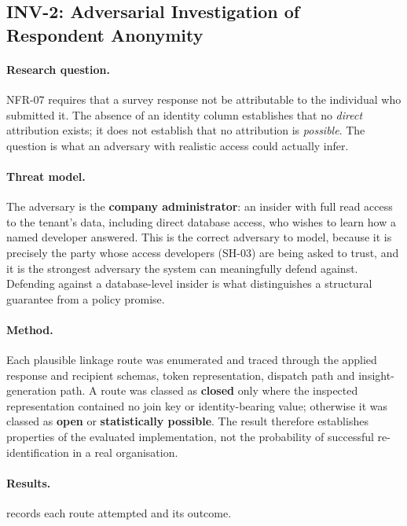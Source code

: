 \subsection{INV-2: Adversarial Investigation of Respondent Anonymity}
\label{subsec:inv2}

\paragraph{Research question.} NFR-07 requires that a survey response not be
attributable to the individual who submitted it. The absence of an identity
column establishes that no \emph{direct} attribution exists; it does not
establish that no attribution is \emph{possible}. The question is what an
adversary with realistic access could actually infer.

\paragraph{Threat model.} The adversary is the \textbf{company administrator}:
an insider with full read access to the tenant's data, including direct database
access, who wishes to learn how a named developer answered. This is the correct
adversary to model, because it is precisely the party whose access developers
(SH-03) are being asked to trust, and it is the strongest adversary the system
can meaningfully defend against. Defending against a database-level insider is
what distinguishes a structural guarantee from a policy promise.

\paragraph{Method.} Each plausible linkage route was enumerated and traced
through the applied response and recipient schemas, token representation,
dispatch path and insight-generation path. A route was classed as
\textbf{closed} only where the inspected representation contained no join key or
identity-bearing value; otherwise it was classed as \textbf{open} or
\textbf{statistically possible}. The result therefore establishes properties of
the evaluated implementation, not the probability of successful
re-identification in a real organisation.

\paragraph{Results.}  records each route attempted and its
outcome.

